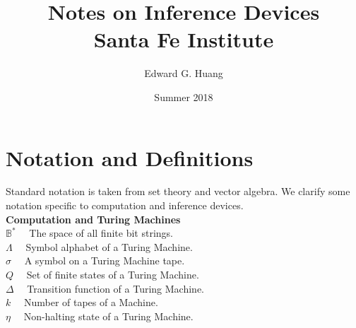 \documentclass[11pt]{article}
\title{
  Notes on Inference Devices \\
  \large Santa Fe Institute}
\author{Edward G. Huang}
\date{Summer 2018}
\newcommand{\B}{\mathbb{B}}
\begin{document}
\maketitle 

\section{Notation and Definitions} 

Standard notation is taken from set theory and vector algebra. We clarify some notation specific to computation and inference devices. \\


\textbf{Computation and Turing Machines} \\
$ \B^{*} \quad $ The space of all finite bit strings. \\
$ \Lambda \quad $ Symbol alphabet of a Turing Machine. \\
$ \sigma \quad $ A symbol on a Turing Machine tape. \\
$ Q \quad $ Set of finite states of a Turing Machine. \\
$ \Delta \quad $ Transition function of a Turing Machine. \\
$ k \quad $ Number of tapes of a Machine. \\
$ \eta \quad $ Non-halting state of a Turing Machine. \\
\end{document}
